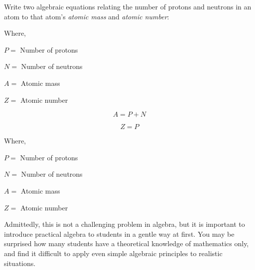 

Write two algebraic equations relating the number of protons and neutrons in an atom to that atom's {\it atomic mass} and {\it atomic number}:

\vskip 10pt

\noindent
Where,

$P =$ Number of protons

$N =$ Number of neutrons

$A =$ Atomic mass

$Z =$ Atomic number

\vskip 10pt







$$A = P + N$$

$$Z = P$$

\noindent
Where,

$P =$ Number of protons

$N =$ Number of neutrons

$A =$ Atomic mass

$Z =$ Atomic number







Admittedly, this is not a challenging problem in algebra, but it is important to introduce practical algebra to students in a gentle way at first.  You may be surprised how many students have a theoretical knowledge of mathematics only, and find it difficult to apply even simple algebraic principles to realistic situations.





